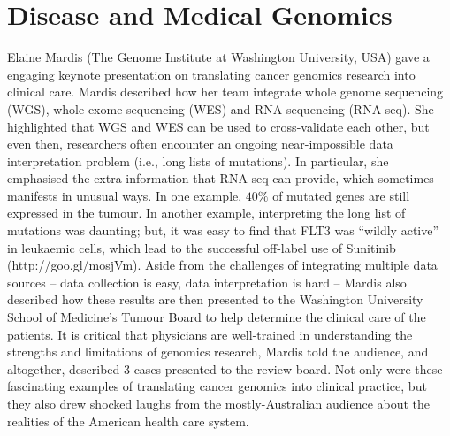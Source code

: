\documentclass[twocolumn]{bmcart}%
\begin{document}

\section*{Disease and Medical Genomics}
Elaine Mardis (The Genome Institute at Washington University, USA) gave a engaging keynote presentation on translating cancer genomics research into clinical care. Mardis described how her team integrate whole genome sequencing (WGS), whole exome sequencing (WES) and RNA sequencing (RNA-seq).  She highlighted that WGS and WES can be used to cross-validate each other, but even then, researchers often encounter an ongoing near-impossible data interpretation problem (i.e., long lists of mutations).  In particular, she emphasised the extra information that RNA-seq can provide, which sometimes manifests in unusual ways.  In one example, $40\%$ of mutated genes are still expressed in the tumour.  In another example, interpreting the long list of mutations was daunting; but, it was easy to find that FLT3 was ``wildly active'' in leukaemic cells, which lead to the successful off-label use of Sunitinib (http://goo.gl/mosjVm).  Aside from the challenges of integrating multiple data sources -- data collection is easy, data interpretation is hard -- Mardis also described how these results are then presented to the Washington University School of Medicine's Tumour Board to help determine the clinical care of the patients. It is critical that physicians are well-trained in understanding the strengths and limitations of genomics research, Mardis told the audience, and altogether, described 3 cases presented to the review board. Not only were these fascinating examples of translating cancer genomics into clinical practice, but they also drew shocked laughs from the mostly-Australian audience about the realities of the American health care system.

\end{document}
